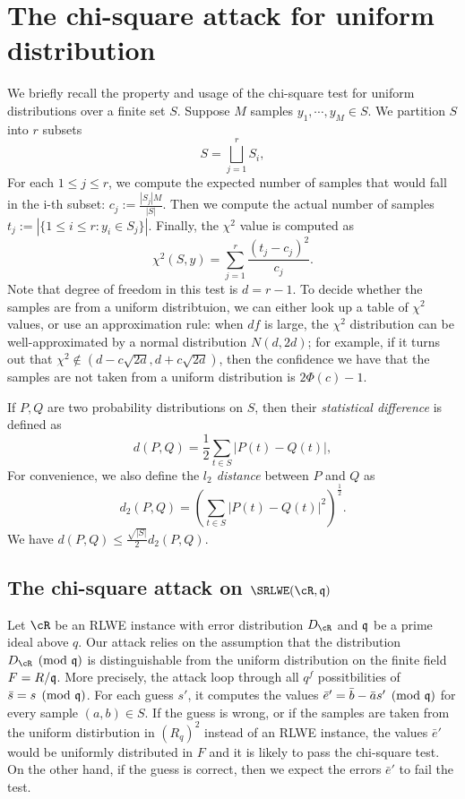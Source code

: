 \documentclass{amsart}
\begin{document}
\section{The chi-square attack for uniform distribution}
\label{sec: chi-square}
We briefly recall the property and usage of the chi-square test for uniform distributions over a finite set $S$. Suppose  $M$ samples $y_1, \cdots, y_M \in S$. We partition $S$ into $r$ subsets
\[
    S = \bigsqcup_{j=1}^r S_i,
\]
For each $1 \leq j \leq r$, we compute the expected number of samples that would fall in the i-th subset: $c_j := \frac{|S_j|M}{|S|}$. Then we compute the actual number of samples $t_j := |\{1 \leq i \leq r: y_i \in S_j\}|$. Finally, the $\chi^2$ value is computed as
\[
    \chi^2(S,y) = \sum_{j = 1}^r \frac{(t_j -c_j)^2}{c_j}.
\]
Note that degree of freedom in this test is $d = r-1$.
To decide whether the samples are from a uniform distribtuion, we can either look up a table of $\chi^2$ values, or use an approximation rule:  when $df$ is large, the $\chi^2$ distribution can be well-approximated by a normal distribution $N(d, 2d)$; for example, if it turns out that $\chi^2 \notin (d - c \sqrt{2d}, d+ c \sqrt{2d})$, then the confidence we have that the samples are not taken from a uniform distribution is $2\Phi(c) - 1$.

If $P,Q$ are two probability distributions on $S$, then their {\it statistical difference} is defined as
\[
    d(P,Q) = \frac{1}{2} \sum_{t \in S} |P(t) - Q(t)|,
\]
For convenience, we also define the {\it $l_2$ distance} between $P$ and $Q$ as
\[
    d_2(P,Q) = (\sum_{t \in S} |P(t) - Q(t)|^2)^{\frac{1}{2}}.
\]
We have $d(P,Q) \leq \frac{\sqrt{|S|}}{2}d_2(P,Q)$.



\subsection{The chi-square attack on $\SRLWE(\cR,\fq)$}

Let $\cR$ be an RLWE instance with error distribution $D_{\cR}$ and $\mathfrak{q}$ be a prime ideal above $q$.  Our attack relies on the assumption that the distribution $D_\cR \pmod {\fq}$ is distinguishable from the uniform distribution on the finite field $F = R/\mathfrak{q}$. More precisely, the attack loop through all $q^f$ possitbilities of $\bar{s} = s \pmod{\mathfrak{q}}$. For each guess $s'$, it computes the values $\bar{e}' = \bar{b} - \bar{a} s' \pmod {\mathfrak{q}}$ for every sample $(a,b) \in S$. If the guess is wrong, or if the samples are taken from the uniform distirbution in $(R_q)^2$ instead of an RLWE instance, the values $\bar{e}'$ would be uniformly distributed in $F$ and it is likely to pass the chi-square test. On the other hand, if the guess is correct, then we expect the errors $\bar{e}'$ to fail the test.
\end{document}
